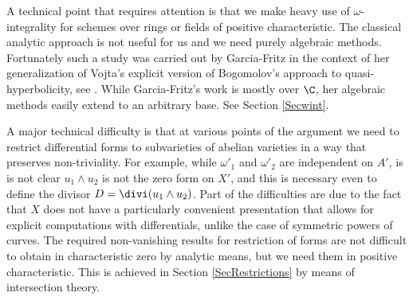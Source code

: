 A technical point that requires attention is that we make heavy use of $\omega$-integrality for schemes over  rings or fields of positive characteristic. The classical analytic approach is not useful for us and we need purely algebraic methods. Fortunately such a study was carried out by Garcia-Fritz \cite{GFthesis,GFtams,GFijnt} in the context of her generalization of Vojta's explicit version of Bogomolov's approach to quasi-hyperbolicity, see \cite{VojtaBuchi,Deschamps}. While Garcia-Fritz's work is mostly over $\C$, her algebraic methods easily extend to an arbitrary base. See Section \ref{Secwint}.

A major technical difficulty is that at various points of the argument we need to restrict differential forms to subvarieties of abelian varieties in a way that preserves non-triviality. For example, while $\omega'_1$ and $\omega'_2$ are independent on $A'$, is is not clear $u_1\wedge u_2$ is not the zero form on $X'$, and this is necessary even to define the divisor $D=\divi(u_1\wedge u_2)$. Part of the difficulties are due to the fact that $X$ does not have a particularly convenient presentation that allows for explicit computations with differentials, unlike the case of symmetric powers of curves. The required non-vanishing results for restriction of forms are not difficult to obtain in characteristic zero by analytic means, but we need them in positive characteristic. This is achieved in Section \ref{SecRestrictions} by means of intersection theory.







